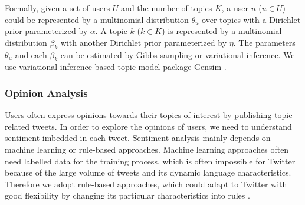 \documentclass[runningheads,a4paper]{llncs}
\begin{document}
Formally, given a set of users $ U $ and the number of topics $ K $, a user $u$ ($ u \in U $) could be represented by a multinomial distribution $ \theta_{u} $ over topics with a Dirichlet prior parameterized by $ \alpha $. 
A topic $ k $ ($ k \in K $) is represented by a multinomial distribution $ \beta_{k} $ with another Dirichlet prior parameterized by $ \eta $. 
The parameters $ \theta_{u} $ and each $ \beta_{k} $ can be estimated by Gibbs sampling or variational inference.
We use variational inference-based topic model package Gensim \cite{rehurek_lrec}.

\subsubsection{Opinion Analysis}
\label{sentiment}

Users often express opinions towards their topics of interest by publishing topic-related tweets. 
In order to explore the opinions of users, we need to understand sentiment imbedded in each tweet.
Sentiment analysis mainly depends on machine learning or rule-based approaches. 
Machine learning approaches often need labelled data for the training process, which is often impossible for Twitter because of the large volume of tweets and its dynamic language characteristics. Therefore we adopt rule-based approaches, which could adapt to Twitter with good flexibility by changing its particular characteristics into rules \cite{thelwall2010sentiment}.
\end{document}
